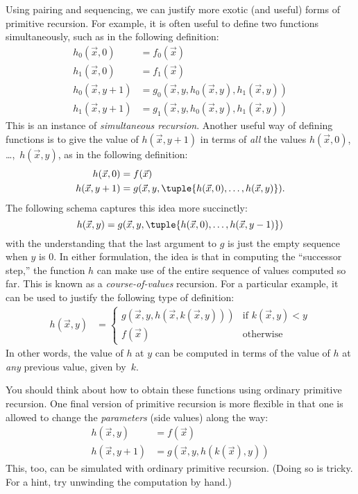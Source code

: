\documentclass[../../../include/open-logic-section]{subfiles}
\begin{document}

Using pairing and sequencing, we can justify more exotic (and
useful) forms of primitive recursion. For example, it is often useful
to define two functions simultaneously, such as in the following
definition:
\begin{align*}
h_0(\vec x, 0) & = f_0(\vec x) \\
h_1(\vec x, 0) & = f_1(\vec x) \\
h_0(\vec x, y+1) & = g_0(\vec x, y, h_0(\vec x, y), h_1(\vec x, y)) \\
h_1(\vec x, y+1) & = g_1(\vec x, y, h_0(\vec x, y), h_1(\vec x, y))
\end{align*}
This is an instance of \emph{simultaneous recursion}. Another useful
way of defining functions is to give the value of $h(\vec x, y+1)$ in
terms of \emph{all} the values $h(\vec x, 0)$, \dots,~$h(\vec x, y)$, as in
the following definition:
\begin{align*}
h(\vec x, 0) & = f(\vec x) \\
h(\vec x, y+1) & = g(\vec x, y, \tuple{h(\vec x, 0), \dots, h(\vec x, y)}).
\end{align*}
The following schema captures this idea more succinctly:
\[
h(\vec x, y) = g(\vec x, y, \tuple{h(\vec x, 0), \dots, h(\vec x, y-1)})
\]
with the understanding that the last argument to $g$ is just the
empty sequence when $y$ is $0$. In either formulation, the idea is
that in computing the ``successor step,'' the function $h$ can make
use of the entire sequence of values computed so far.
This is known as a \emph{course-of-values} recursion. For a particular
example, it can be used to justify the following type of definition:
\begin{align*}
h(\vec x, y) & = \begin{cases}
  g(\vec x, y, h(\vec x, k(\vec x, y))) & \text{if $k(\vec x, y) < y$} \\
  f(\vec x) & \text{otherwise}
\end{cases}
\end{align*}
In other words, the value of $h$ at $y$ can be computed in terms of
the value of $h$ at \emph{any} previous value, given by~$k$.

You should think about how to obtain these functions using ordinary
primitive recursion. One final version of primitive recursion is more
flexible in that one is allowed to change the \emph{parameters} (side
values) along the way:
\begin{align*}
h(\vec x, y) & = f(\vec x) \\
h(\vec x, y+1) & = g(\vec x, y, h(k(\vec x), y))
\end{align*}
This, too, can be simulated with ordinary primitive recursion. (Doing
so is tricky. For a hint, try unwinding the computation by hand.)
\end{document}
